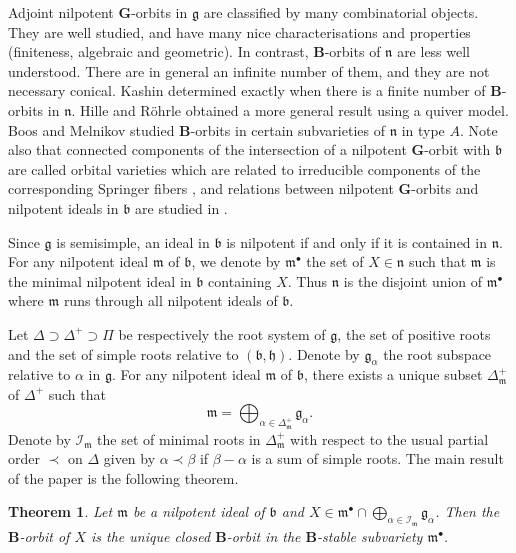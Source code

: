 \documentclass{amsart}
\newtheorem{theorem}{Theorem}[section]
\theoremstyle{definition}
\theoremstyle{remark}
\numberwithin{equation}{section}
\newcommand{\soc}[1]{\mathcal{I}_{#1}}
\newcommand{\group}[1]{\mathbf{#1}}
\begin{document}
Adjoint nilpotent $\group{G}$-orbits in $\mathfrak{g}$ are classified by many combinatorial objects. 
They are well studied,
and have many nice characterisations and properties (finiteness, algebraic and geometric). In contrast, 
$\group{B}$-orbits of $\mathfrak{n}$ are less well understood. There are in general an infinite number
of them, and they are not necessary conical. Kashin \cite{K} determined exactly when there is a 
finite number of $\group{B}$-orbits in $\mathfrak{n}$. Hille and R\"ohrle \cite{HR} obtained a more
general result using a quiver model. Boos \cite{B} and Melnikov \cite{M1} studied $\group{B}$-orbits 
in certain subvarieties
of $\mathfrak{n}$ in type $A$. Note also that
connected components of the intersection of a nilpotent $\group{G}$-orbit with $\mathfrak{b}$ are called 
orbital varieties which are related to irreducible components of the corresponding Springer 
fibers \cite{S,FM}, and relations between nilpotent $\group{G}$-orbits and nilpotent ideals in 
$\mathfrak{b}$ are studied in \cite{So2}.

Since $\mathfrak{g}$ is semisimple,
an ideal in $\mathfrak{b}$ is nilpotent if and only if it is contained in $\mathfrak{n}$.
For any nilpotent ideal $\mathfrak{m}$ of $\mathfrak{b}$, we denote by $\mathfrak{m}^{\bullet}$
the set of $X\in \mathfrak{n}$ such that $\mathfrak{m}$ is the minimal nilpotent ideal in $\mathfrak{b}$
containing $X$. Thus $\mathfrak{n}$ is the disjoint union of $\mathfrak{m}^{\bullet}$ where $\mathfrak{m}$
runs through all nilpotent ideals of $\mathfrak{b}$.

Let $\Delta \supset \Delta^{+} \supset \Pi$ be respectively the root system of $\mathfrak{g}$, the 
set of positive roots and the set of simple roots relative to $( \mathfrak{b} , \mathfrak{h})$. Denote by 
$\mathfrak{g}_{\alpha}$ the root subspace relative to $\alpha$ in $\mathfrak{g}$. 
For any nilpotent ideal $\mathfrak{m}$ of $\mathfrak{b}$, there exists a unique subset 
$\Delta_{\mathfrak{m}}^{+}$ of $\Delta^{+}$ such that
$$
\mathfrak{m} = \bigoplus_{\alpha\in \Delta^{+}_{\mathfrak{m}}} \mathfrak{g}_{\alpha}.
$$
Denote by $\soc{\mathfrak{m}}$ the set of minimal roots in $\Delta_{\mathfrak{m}}^{+}$
with respect to the usual partial order $\prec$ on $\Delta$ given by 
$\alpha \prec \beta$ if $\beta - \alpha$ is a sum of simple roots. 
The main result of the paper is the following theorem.

\begin{theorem}\label{main-theorem}
Let $\mathfrak{m}$ be a nilpotent ideal of $\mathfrak{b}$ and 
$X\in \mathfrak{m}^{\bullet}\cap \bigoplus_{\alpha \in \soc{\mathfrak{m}}} \mathfrak{g}_{\alpha}$.
Then the $\group{B}$-orbit of $X$ is the unique closed $\group{B}$-orbit in the $\group{B}$-stable 
subvariety $\mathfrak{m}^{\bullet}$.
\end{theorem}
\end{document}
